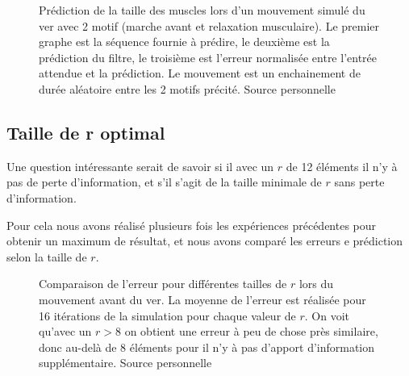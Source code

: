 \begin{figure}[ht]
   \begin{center}
   \end{center}
   \caption[Prédiction de la taille des muscles lors d'un mouvement avec 2
   motif]{Prédiction de la taille des muscles lors d'un mouvement simulé du ver
   avec 2 motif (marche avant et relaxation musculaire). Le premier graphe est
   la séquence fournie à prédire, le deuxième est la prédiction du filtre, le
   troisième est l'erreur normalisée entre l'entrée attendue et la prédiction.
   Le mouvement est un enchainement de durée aléatoire entre les 2 motifs
   précité. Source personnelle}
   \label{fig:sequence_mouvement_complexe_2pattern}
\end{figure}


\subsection{Taille de r optimal} %
\label{sub:Taille de r optimal}

Une question intéressante serait de savoir si il avec un $r$ de 12 éléments il n'y à
pas de perte d'information, et s'il s'agit de la taille minimale de $r$ sans perte
d'information.

Pour cela nous avons réalisé plusieurs fois les expériences précédentes pour obtenir
un maximum de résultat, et nous avons comparé les erreurs e prédiction selon la
taille de $r$.


\begin{figure}[ht]
   \begin{center}
   \end{center}
   \caption[Comparaison de l'erreur pour différents $r$ lors du mouvement avant]{
   Comparaison de l'erreur pour différentes tailles de $r$ lors du mouvement avant
   du ver. La moyenne de l'erreur est réalisée pour 16 itérations de la simulation
   pour chaque valeur de $r$. On voit qu'avec un $r > 8$ on obtient une erreur à
   peu de chose près similaire, donc au-delà de 8 éléments pour  il n'y à pas
   d'apport d'information supplémentaire. Source personnelle}
   \label{fig:comparaison_r_mouvement_simple}
\end{figure}

